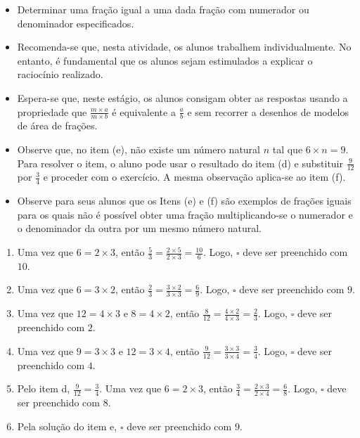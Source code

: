 \begin{atividade}\label{chap4-ativ10}
\objetivos
\begin{itemize} %
    \item       Determinar uma fração igual a uma dada fração com numerador ou
denominador especificados.
\end{itemize} %

\discussoes
\begin{itemize} %
    \item       Recomenda-se que, nesta atividade, os alunos trabalhem
individualmente. No entanto, é fundamental que os alunos sejam estimulados a
explicar o raciocínio realizado.
    \item       Espera-se que, neste estágio, os alunos consigam obter as
respostas usando a propriedade que       $\frac{m \times a}{m \times b}$       é
equivalente a       $\frac{a}{b}$       e sem recorrer a desenhos de modelos de
área de frações.
    \item       Observe que, no item (e), não existe um número natural       $n$
      tal que       $6 \times n = 9$. Para resolver o item, o aluno pode usar o
resultado do item (d) e substituir       $\frac{9}{12}$       por
$\frac{3}{4}$       e proceder com o exercício. A mesma observação aplica-se ao
item (f).
    \item       Observe para seus alunos que os Itens (e) e (f) são exemplos de
frações iguais para os quais não é possível obter uma fração multiplicando-se o
numerador e o denominador da outra por um mesmo número natural.
\end{itemize} %

\solucao
\begin{enumerate} %
    \item       Uma vez que       $6 = 2 \times 3$, então       $\frac{5}{3} =
\frac{2 \times 5}{2 \times 3} = \frac{10}{6}$. Logo,       $\square$       deve
ser preenchido com       $10$.
    \item       Uma vez que       $6 = 3 \times 2$, então       $\frac{2}{3} =
\frac{3 \times 2}{3 \times 3} = \frac{6}{9}$. Logo,       $\square$       deve
ser preenchido com       $9$.
    \item       Uma vez que       $12 = 4 \times 3$       e       $8 = 4 \times
2$, então       $\frac{8}{12} = \frac{4 \times 2}{4 \times 3} = \frac{2}{3}$.
Logo,       $\square$       deve ser preenchido com       $2$.
    \item       Uma vez que       $9 = 3 \times 3$       e       $12 = 3 \times
4$, então       $\frac{9}{12} = \frac{3 \times 3}{3 \times 4} = \frac{3}{4}$.
Logo,       $\square$       deve ser preenchido com       $4$.
    \item       Pelo item d,       $\frac{9}{12} = \frac{3}{4}$. Uma vez que
  $6 = 2 \times 3$, então       $\frac{3}{4} = \frac{2 \times 3}{2 \times 4} =
\frac{6}{8}$. Logo,       $\square$       deve ser preenchido com       $8$.
    \item       Pela solução do item e,       $\square$       deve ser
preenchido com       $9$.
\end{enumerate} %

\end{atividade}

